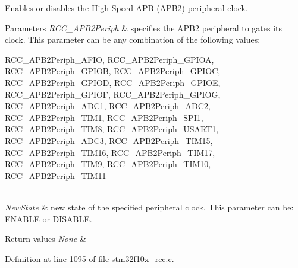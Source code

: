 Enables or disables the High Speed A\+PB (A\+P\+B2) peripheral clock. 


\begin{DoxyParams}{Parameters}
{\em R\+C\+C\+\_\+\+A\+P\+B2\+Periph} & specifies the A\+P\+B2 peripheral to gates its clock. This parameter can be any combination of the following values\+: \begin{DoxyItemize}
\item R\+C\+C\+\_\+\+A\+P\+B2\+Periph\+\_\+\+A\+F\+IO, R\+C\+C\+\_\+\+A\+P\+B2\+Periph\+\_\+\+G\+P\+I\+OA, R\+C\+C\+\_\+\+A\+P\+B2\+Periph\+\_\+\+G\+P\+I\+OB, R\+C\+C\+\_\+\+A\+P\+B2\+Periph\+\_\+\+G\+P\+I\+OC, R\+C\+C\+\_\+\+A\+P\+B2\+Periph\+\_\+\+G\+P\+I\+OD, R\+C\+C\+\_\+\+A\+P\+B2\+Periph\+\_\+\+G\+P\+I\+OE, R\+C\+C\+\_\+\+A\+P\+B2\+Periph\+\_\+\+G\+P\+I\+OF, R\+C\+C\+\_\+\+A\+P\+B2\+Periph\+\_\+\+G\+P\+I\+OG, R\+C\+C\+\_\+\+A\+P\+B2\+Periph\+\_\+\+A\+D\+C1, R\+C\+C\+\_\+\+A\+P\+B2\+Periph\+\_\+\+A\+D\+C2, R\+C\+C\+\_\+\+A\+P\+B2\+Periph\+\_\+\+T\+I\+M1, R\+C\+C\+\_\+\+A\+P\+B2\+Periph\+\_\+\+S\+P\+I1, R\+C\+C\+\_\+\+A\+P\+B2\+Periph\+\_\+\+T\+I\+M8, R\+C\+C\+\_\+\+A\+P\+B2\+Periph\+\_\+\+U\+S\+A\+R\+T1, R\+C\+C\+\_\+\+A\+P\+B2\+Periph\+\_\+\+A\+D\+C3, R\+C\+C\+\_\+\+A\+P\+B2\+Periph\+\_\+\+T\+I\+M15, R\+C\+C\+\_\+\+A\+P\+B2\+Periph\+\_\+\+T\+I\+M16, R\+C\+C\+\_\+\+A\+P\+B2\+Periph\+\_\+\+T\+I\+M17, R\+C\+C\+\_\+\+A\+P\+B2\+Periph\+\_\+\+T\+I\+M9, R\+C\+C\+\_\+\+A\+P\+B2\+Periph\+\_\+\+T\+I\+M10, R\+C\+C\+\_\+\+A\+P\+B2\+Periph\+\_\+\+T\+I\+M11 \end{DoxyItemize}
\\
\hline
{\em New\+State} & new state of the specified peripheral clock. This parameter can be\+: E\+N\+A\+B\+LE or D\+I\+S\+A\+B\+LE. \\
\hline
\end{DoxyParams}

\begin{DoxyRetVals}{Return values}
{\em None} & \\
\hline
\end{DoxyRetVals}


Definition at line 1095 of file stm32f10x\+\_\+rcc.\+c.


